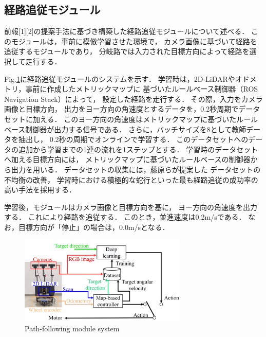 \documentclass{sice-si}
\begin{document}
\subsection{経路追従モジュール}
前報[1][2]の提案手法に基づき構築した経路追従モジュールについて述べる．
このモジュールは，事前に模倣学習させた環境で，
カメラ画像に基づいて経路を追従するモジュールであり，
分岐路では入力された目標方向によって経路を選択して走行する．
\par
Fig.\ref{fig:learning}に経路追従モジュールのシステムを示す．
学習時は，2D-LiDARやオドメトリ，事前に作成したメトリックマップに
基づいたルールベース制御器（ROS Navigation Stack\cite{ros-navigation}）によって，
設定した経路を走行する．
その際，入力をカメラ画像と目標方向，
出力をヨー方向の角速度とするデータを，0.2秒周期でデータセットに加える．
このヨー方向の角速度はメトリックマップに基づいたルールベース制御器が出力する信号である．
さらに，バッチサイズを8として教師データを抽出し，
0.2秒の周期でオンラインで学習する．
このデータセットへのデータの追加から学習までの1連の流れを1ステップとする．
学習時のデータセットへ加える目標方向には，
メトリックマップに基づいたルールベースの制御器から出力を用いる．
データセットの収集には，藤原ら\cite{fujiwara2023}が提案した
データセットの不均衡の改善，
学習時における積極的な蛇行といった最も経路追従の成功率の高い手法を採用する．
\par
学習後，モジュールはカメラ画像と目標方向を基に，
ヨー方向の角速度を出力する．
これにより経路を追従する．
このとき，並進速度は0.2m/sである．
なお，目標方向が「停止」の場合は，0.0m/sとなる．
\begin{figure}[htbp]
    \centering
     \includegraphics[width=80mm]{./figs/system_learning.pdf}
     \caption{Path-following module system}\label{fig:learning}
\end{figure}
\end{document}
